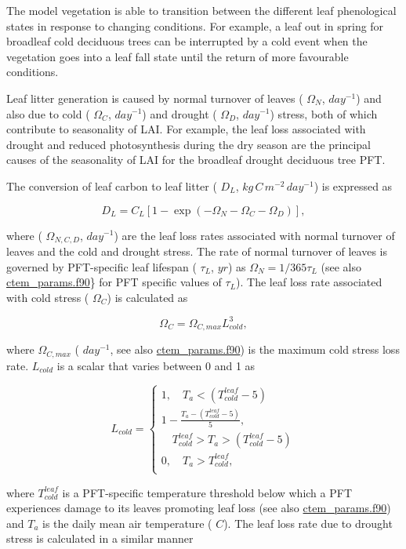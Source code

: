 The model vegetation is able to transition between the different leaf phenological states in response to changing conditions. For example, a leaf out in spring for broadleaf cold deciduous trees can be interrupted by a cold event when the vegetation goes into a leaf fall state until the return of more favourable conditions.

Leaf litter generation is caused by normal turnover of leaves ( $\Omega_N$, $day^{-1}$) and also due to cold ( $\Omega_C$, $day^{-1}$) and drought ( $\Omega_D$, $day^{-1}$) stress, both of which contribute to seasonality of L\+A\+I. For example, the leaf loss associated with drought and reduced photosynthesis during the dry season are the principal causes of the seasonality of L\+A\+I for the broadleaf drought deciduous tree P\+F\+T.

The conversion of leaf carbon to leaf litter ( $D_L$, $kg\,C\,m^{-2}\,day^{-1}$) is expressed as

\[ \label{cltod} D_L = C_L[1 - \exp(-\Omega_N - \Omega_C - \Omega_{D})],\]

where ( $\Omega_{N,C,D}$, $day^{-1}$) are the leaf loss rates associated with normal turnover of leaves and the cold and drought stress. The rate of normal turnover of leaves is governed by P\+F\+T-\/specific leaf lifespan ( $\tau_L$, $yr$) as $\Omega_N= 1/365 \tau_L$ (see also \hyperlink{ctem__params_8f90}{ctem\+\_\+params.\+f90}\} for P\+F\+T specific values of $\tau_L$). The leaf loss rate associated with cold stress ( $\Omega_C$) is calculated as

\[ \label{gamma_cold} \Omega_C = \Omega_{C,max}L_{cold}^3, \]

where $\Omega_{C,max}$ ( $day^{-1}$, see also \hyperlink{ctem__params_8f90}{ctem\+\_\+params.\+f90}) is the maximum cold stress loss rate. $L_{cold}$ is a scalar that varies between 0 and 1 as

\[ \label{cldls} L_{cold} = \begin{cases} 1, \quad T_a < \left(T_{cold}^{leaf} - 5\right) \\ 1 - \frac{T_a - \left(T_{cold}^{leaf} - 5\right)}{5}, \\ \quad T_{cold}^{leaf} > T_a > (T_{cold}^{leaf} - 5) \\ 0, \quad T_a > T_{cold}^{leaf} ,\\ \end{cases} \]

where $T_{cold}^{leaf}$ is a P\+F\+T-\/specific temperature threshold below which a P\+F\+T experiences damage to its leaves promoting leaf loss (see also \hyperlink{ctem__params_8f90}{ctem\+\_\+params.\+f90}) and $T_a$ is the daily mean air temperature ( $C$). The leaf loss rate due to drought stress is calculated in a similar manner

